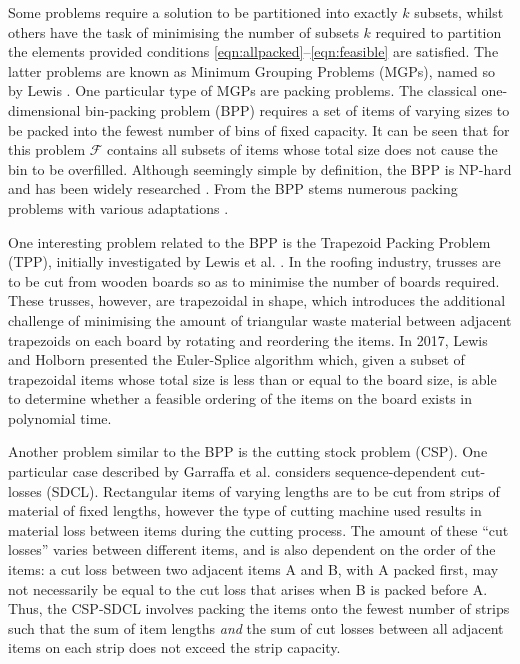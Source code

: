 \documentclass{elsarticle}
\begin{document}
Some problems require a solution to be partitioned into exactly $k$ subsets, whilst others have the task of minimising the number of subsets $k$ required to partition the elements provided conditions \eqref{eqn:allpacked}--\eqref{eqn:feasible} are satisfied. The latter problems are known as Minimum Grouping Problems (MGPs), named so by Lewis \cite{lewis2009}. One particular type of MGPs are packing problems. The classical one-dimensional bin-packing problem (BPP) requires a set of items of varying sizes to be packed into the fewest number of bins of fixed capacity. It can be seen that for this problem $\mathcal{F}$ contains all subsets of items whose total size does not cause the bin to be overfilled. Although seemingly simple by definition, the BPP is NP-hard and has been widely researched \cite{coffman1984, decarvalho1999, fleszar2002}. From the BPP stems numerous packing problems with various adaptations \cite{coffman1987, haouari2009}.

One interesting problem related to the BPP is the Trapezoid Packing Problem (TPP), initially investigated by Lewis et al. \cite{lewis2011}. In the roofing industry, trusses are to be cut from wooden boards so as to minimise the number of boards required. These trusses, however, are trapezoidal in shape, which introduces the additional challenge of minimising the amount of triangular waste material between adjacent trapezoids on each board by rotating and reordering the items. In 2017, Lewis and Holborn \cite{lewis2017} presented the Euler-Splice algorithm which, given a subset of trapezoidal items whose total size is less than or equal to the board size, is able to determine whether a feasible ordering of the items on the board exists in polynomial time.

Another problem similar to the BPP is the cutting stock problem (CSP). One particular case described by Garraffa et al. \cite{garraffa2016} considers sequence-dependent cut-losses (SDCL). Rectangular items of varying lengths are to be cut from strips of material of fixed lengths, however the type of cutting machine used results in material loss between items during the cutting process. The amount of these ``cut losses'' varies between different items, and is also dependent on the order of the items: a cut loss between two adjacent items A and B, with A packed first, may not necessarily be equal to the cut loss that arises when B is packed before A. Thus, the CSP-SDCL involves packing the items onto the fewest number of strips such that the sum of item lengths \emph{and} the sum of cut losses between all adjacent items on each strip does not exceed the strip capacity.
\end{document}
